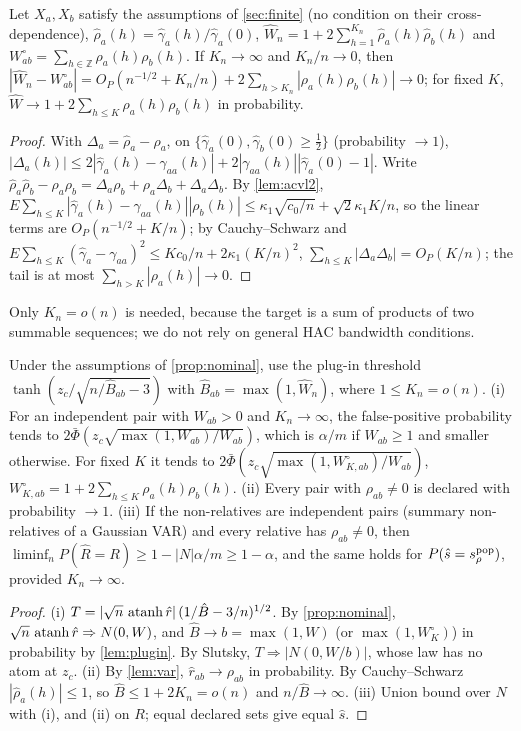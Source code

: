 \begin{lemma}\label{lem:plugin}
Let $X_a,X_b$ satisfy the assumptions of \cref{sec:finite} (no condition on their cross-dependence),
$\hat\rho_a(h)=\hat\gamma_a(h)/\hat\gamma_a(0)$, $\hat W_n=1+2\sum_{h=1}^{K_n}\hat\rho_a(h)\hat\rho_b(h)$ and
$W^\circ_{ab}=\sum_{h\in\mathbb Z}\rho_a(h)\rho_b(h)$. If $K_n\to\infty$ and $K_n/n\to0$, then
$|\hat W_n-W^\circ_{ab}|=O_P(n^{-1/2}+K_n/n)+2\sum_{h>K_n}|\rho_a(h)\rho_b(h)|\to0$; for fixed $K$,
$\hat W\to1+2\sum_{h\le K}\rho_a(h)\rho_b(h)$ in probability.
\end{lemma}
\begin{proof}
With $\Delta_a=\hat\rho_a-\rho_a$, on $\{\hat\gamma_a(0),\hat\gamma_b(0)\ge\frac12\}$ (probability $\to1$),
$|\Delta_a(h)|\le2|\hat\gamma_a(h)-\gamma_{aa}(h)|+2|\gamma_{aa}(h)||\hat\gamma_a(0)-1|$. Write
$\hat\rho_a\hat\rho_b-\rho_a\rho_b=\Delta_a\rho_b+\rho_a\Delta_b+\Delta_a\Delta_b$. By \cref{lem:acvl2},
$E\sum_{h\le K}|\hat\gamma_a(h)-\gamma_{aa}(h)||\rho_b(h)|\le\kappa_1\sqrt{c_0/n}+\sqrt2\kappa_1K/n$, so the linear terms
are $O_P(n^{-1/2}+K/n)$; by Cauchy--Schwarz and $E\sum_{h\le K}(\hat\gamma_a-\gamma_{aa})^2\le Kc_0/n+2\kappa_1(K/n)^2$,
$\sum_{h\le K}|\Delta_a\Delta_b|=O_P(K/n)$; the tail is at most $\sum_{h>K}|\rho_a(h)|\to0$.
\end{proof}
Only $K_n=o(n)$ is needed, because the target is a sum of products of two summable sequences; we do not rely on
general HAC bandwidth conditions.

\begin{proposition}\label{prop:plugin}
Under the assumptions of \cref{prop:nominal}, use the plug-in threshold $\tanh(z_c/\sqrt{n/\hat B_{ab}-3})$ with
$\hat B_{ab}=\max(1,\hat W_n)$, where $1\le K_n=o(n)$.
(i) For an independent pair with $W_{ab}>0$ and $K_n\to\infty$, the false-positive probability tends to
$2\bar\Phi(z_c\sqrt{\max(1,W_{ab})/W_{ab}})$, which is $\alpha/m$ if $W_{ab}\ge1$ and smaller otherwise. For fixed $K$ it
tends to $2\bar\Phi(z_c\sqrt{\max(1,W^\circ_{K,ab})/W_{ab}})$, $W^\circ_{K,ab}=1+2\sum_{h\le K}\rho_a(h)\rho_b(h)$.
(ii) Every pair with $\rho_{ab}\ne0$ is declared with probability $\to1$.
(iii) If the non-relatives are independent pairs (summary non-relatives of a Gaussian VAR) and every relative has
$\rho_{ab}\ne0$, then $\liminf_nP(\hat R=R)\ge1-|N|\alpha/m\ge1-\alpha$, and the same holds for
$P(\hat s=s_\rho^{\mathrm{pop}})$, provided $K_n\to\infty$.
\end{proposition}
\begin{proof}
(i) $T=|\sqrt n\,\operatorname{atanh}\hat r|\,(1/\hat B-3/n)^{1/2}$. By \cref{prop:nominal}, $\sqrt n\,\operatorname{atanh}\hat r\Rightarrow N(0,W)$,
and $\hat B\to b=\max(1,W)$ (or $\max(1,W^\circ_K)$) in probability by \cref{lem:plugin}. By Slutsky,
$T\Rightarrow|N(0,W/b)|$, whose law has no atom at $z_c$. (ii) By \cref{lem:var}, $\hat r_{ab}\to\rho_{ab}$ in
probability. By Cauchy--Schwarz $|\hat\rho_a(h)|\le1$, so $\hat B\le1+2K_n=o(n)$ and $n/\hat B\to\infty$.
(iii) Union bound over $N$ with (i), and (ii) on $R$; equal declared sets give equal $\hat s$.
\end{proof}

